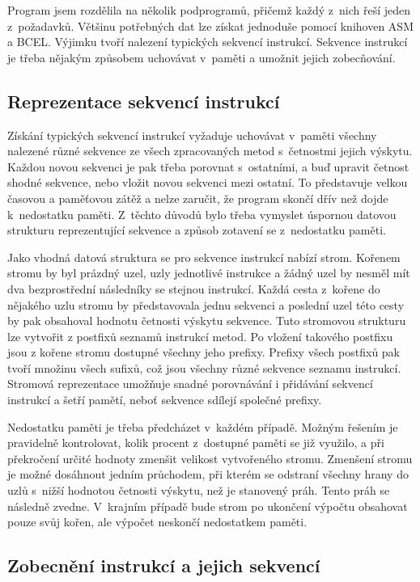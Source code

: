 Program jsem rozdělila na několik podprogramů, přičemž každý z~nich řeší jeden z~požadavků. 
Většinu potřebných dat lze získat jednoduše pomocí knihoven ASM a BCEL. Výjimku tvoří nalezení typických sekvencí instrukcí. Sekvence instrukcí je třeba nějakým způsobem uchovávat v~paměti a umožnit jejich zobecňování.

\subsection{Reprezentace sekvencí instrukcí}

Získání typických sekvencí instrukcí vyžaduje uchovávat v~paměti všechny nalezené různé sekvence ze všech zpracovaných metod s~četnostmi jejich výskytu. Každou novou sekvenci je pak třeba porovnat s~ostatními, a buď upravit četnost shodné sekvence, nebo vložit novou sekvenci mezi ostatní. To představuje velkou časovou a paměťovou zátěž a nelze zaručit, že program skončí dřív než dojde k~nedostatku paměti. Z~těchto důvodů bylo třeba vymyslet úspornou datovou strukturu reprezentující sekvence a způsob zotavení se z~nedostatku paměti.

Jako vhodná datová struktura se pro sekvence instrukcí nabízí strom. Kořenem stromu by byl prázdný uzel, uzly jednotlivé instrukce a žádný uzel by nesměl mít dva bezprostřední následníky se stejnou instrukcí. Každá cesta z~kořene do nějakého uzlu stromu by představovala jednu sekvenci a poslední uzel této cesty by pak obsahoval hodnotu četnosti výskytu sekvence. Tuto stromovou strukturu lze vytvořit z postfixů seznamů instrukcí metod. 
Po vložení takového postfixu jsou z kořene stromu dostupné všechny jeho prefixy. Prefixy všech postfixů pak tvoří množinu všech sufixů, což jsou všechny různé sekvence seznamu instrukcí.
Stromová reprezentace umožňuje snadné porovnávání i přidávání sekvencí instrukcí a šetří pamětí, neboť sekvence sdílejí společné prefixy.

Nedostatku paměti je třeba předcházet v~každém případě. Možným řešením je pravidelně kontrolovat, kolik procent z~dostupné paměti se již využilo, a při překročení určité hodnoty zmenšit velikost vytvořeného stromu. Zmenšení stromu je možné dosáhnout jedním průchodem, při kterém se odstraní všechny hrany do uzlů s~nižší hodnotou četnosti výskytu, než je stanovený práh. Tento práh se následně zvedne. V~krajním případě bude strom po ukončení výpočtu obsahovat pouze svůj kořen, ale výpočet neskončí nedostatkem paměti.

\subsection{Zobecnění instrukcí a jejich sekvencí}

